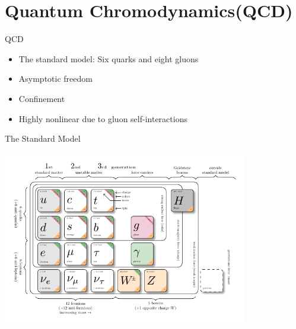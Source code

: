 \documentclass[10pt,show notes on second screen]{beamer}
\begin{document}
\section{Quantum Chromodynamics(QCD)}

\begin{frame}{QCD}
\begin{itemize}[<+->]
    \item The standard model: Six quarks and eight gluons
    \item Asymptotic freedom
    \item Confinement
    \item Highly nonlinear due to gluon self-interactions
\end{itemize}
\end{frame}

\begin{frame}{The Standard Model}
    \begin{center}
        \includegraphics[width=0.8\textwidth]{../figures/illustrations/qcd/standard-model/sm.pdf}
    \end{center}
\end{frame}
\end{document}
